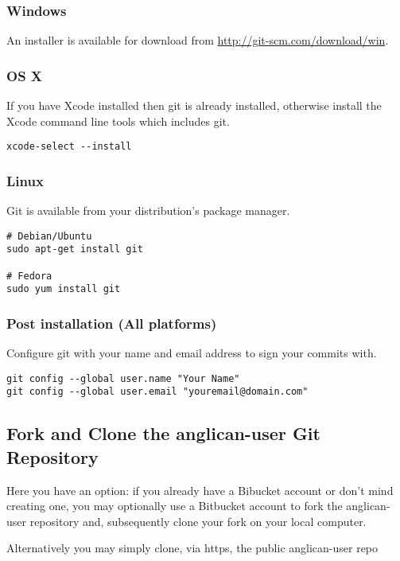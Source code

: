 \documentclass{article}
\begin{document}
\subsubsection{Windows}

An installer is available for download from
\url{http://git-scm.com/download/win}.

\subsubsection{OS X}

If you have Xcode installed then git is already installed, otherwise install the Xcode command line tools which includes git. 

\begin{verbatim}
xcode-select --install
\end{verbatim}

\subsubsection{Linux}

Git is available from your distribution's package manager.

\begin{verbatim}
# Debian/Ubuntu
sudo apt-get install git

# Fedora
sudo yum install git
\end{verbatim}

\subsubsection{Post installation (All platforms)}

Configure git with your name and email address to sign your commits with.
\begin{verbatim}
git config --global user.name "Your Name"
git config --global user.email "youremail@domain.com"
\end{verbatim}


\subsection{Fork and Clone the anglican-user Git Repository}
Here you have an option: if you already have a Bibucket account or don't mind creating one, you may optionally
use a Bitbucket account to fork the anglican-user repository 
and, subsequently clone your fork on your local computer.  

Alternatively you may simply clone, via https, the public anglican-user repo
\end{document}
